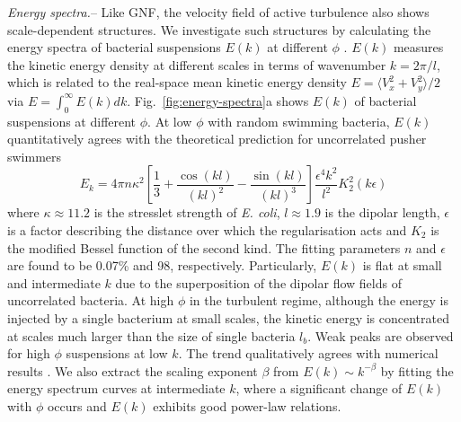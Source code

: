 \documentclass[twocolumn,aps,prl,amsmath,amssymb,longbibliography]{revtex4-2}
\begin{document}
\textit{Energy spectra.}--
Like GNF, the velocity field of active turbulence also shows scale-dependent structures.
We investigate such structures by calculating the energy spectra of bacterial suspensions $E(k)$ at different $\phi$ \cite{Liu2020}. $E(k)$ measures the kinetic energy density at different scales in terms of wavenumber $k = 2\pi/l$, which is related to the real-space mean kinetic energy density $E = \langle V_x^2 + V_y^2 \rangle/2$ via $E = \int_0^\infty E(k)dk$. Fig.~\ref{fig:energy-spectra}a shows $E(k)$ of bacterial suspensions at different $\phi$.
At low $\phi$ with random swimming bacteria, $E(k)$ quantitatively agrees with the theoretical prediction for uncorrelated pusher swimmers \cite{Bardfalvy2019}
\begin{equation}
E_k = 4\pi n \kappa^2 \left[ \frac{1}{3} + \frac{\cos(kl)}{(kl)^2} - \frac{\sin(kl)}{(kl)^3} \right] \frac{\epsilon^4k^2}{l^2} K_2^2(k\epsilon)
\end{equation}
where  $\kappa \approx 11.2$ is the stresslet strength of \textit{E. coli}, $l\approx 1.9$ is the dipolar length, $\epsilon$ is a factor describing the distance over which the regularisation acts and $K_2$ is the modified Bessel function of the second kind. The fitting parameters $n$ and $\epsilon$ are found to be 0.07\% and 98, respectively.
Particularly, $E(k)$ is flat at small and intermediate $k$ due to the superposition of the dipolar flow fields of uncorrelated bacteria.
At high $\phi$ in the turbulent regime, although the energy is injected by a single bacterium at small scales, the kinetic energy is concentrated at scales much larger than the size of single bacteria $l_b$.
Weak peaks are observed for high $\phi$ suspensions at low $k$. The trend qualitatively agrees with numerical results \cite{Saintillan2012,Bardfalvy2019}. We also extract the scaling exponent $\beta$ from $E(k) \sim k^{-\beta}$ by fitting the energy spectrum curves at intermediate $k$, where a significant change of $E(k)$ with $\phi$ occurs and $E(k)$ exhibits good power-law relations.
\end{document}
